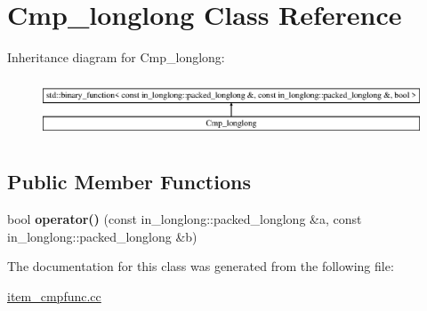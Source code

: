 \hypertarget{classCmp__longlong}{}\section{Cmp\+\_\+longlong Class Reference}
\label{classCmp__longlong}
Inheritance diagram for Cmp\+\_\+longlong\+:\begin{figure}[H]
\begin{center}
\leavevmode
\includegraphics[height=1.783440cm]{classCmp__longlong}
\end{center}
\end{figure}
\subsection*{Public Member Functions}
\begin{DoxyCompactItemize}
\item 
\mbox{\label{classCmp__longlong_a44bf6522b7a1e8a9de384b46166a1716}} 
bool {\bfseries operator()} (const in\+\_\+longlong\+::packed\+\_\+longlong \&a, const in\+\_\+longlong\+::packed\+\_\+longlong \&b)
\end{DoxyCompactItemize}


The documentation for this class was generated from the following file\+:\begin{DoxyCompactItemize}
\item 
\mbox{\hyperlink{item__cmpfunc_8cc}{item\+\_\+cmpfunc.\+cc}}\end{DoxyCompactItemize}
